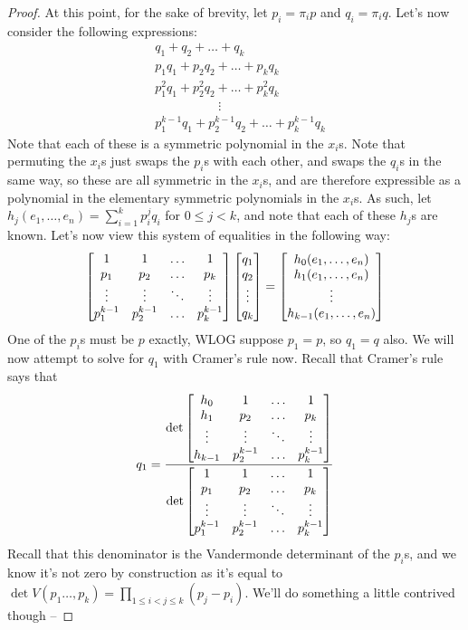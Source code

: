 \documentclass[12pt]{scrartcl}
\begin{document}
\begin{proof}
At this point, for the sake of brevity, let $p_i = \pi_i p$ and $q_i = \pi_i q$. Let's now consider the following expressions: 
\begin{align*}
    & q_1 + q_2 + \dots + q_k \\ 
    & p_1 q_1 + p_2 q_2 + \dots + p_k q_k \\ 
    & p_1^2 q_1 + p_2^2 q_2 + \dots + p_k^2 q_k \\ 
    & \qquad \qquad \quad \vdots \\
    & p_1^{k-1} q_1 + p_2^{k-1} q_2 + \dots + p_k^{k-1} q_k 
\end{align*}
Note that each of these is a symmetric polynomial in the $x_i$s. Note that permuting the $x_i$s just swaps the $p_i$s with each other, and swaps the $q_i$s in the same way, so these are all symmetric in the $x_i$s, and are therefore expressible as a polynomial in the elementary symmetric polynomials in the $x_i$s. As such, let $h_j(e_1, \dots, e_n) = \sum_{i=1}^k p_i^j q_i$ for $0 \leq j < k$, and note that each of these $h_j$s are known. 
Let's now view this system of equalities in the following way: 
\[
    \begin{bmatrix}1 & 1 & \dots & 1 \\
          p_1 & p_2 & \dots & p_k \\ 
          \vdots & \vdots & \ddots & \vdots \\ 
          p_1^{k-1} & p_2^{k-1} & \dots & p_k^{k-1}\end{bmatrix}
    \begin{bmatrix}q_1 \\ q_2 \\ \vdots \\ q_k \end{bmatrix} = \begin{bmatrix}h_0(e_1, \dots, e_n) \\ h_1 (e_1, \dots, e_n) \\ \vdots \\  h_{k-1}(e_1, \dots, e_n)\end{bmatrix} 
\]
One of the $p_i$s must be $p$ exactly, WLOG suppose $p_1 = p$, so $q_1 = q$ also. We will now attempt to solve for $q_1$ with Cramer's rule now. Recall that Cramer's rule says that
\[
    q_1 = \frac{\det \begin{bmatrix}h_0 & 1 & \dots & 1 \\
          h_1 & p_2 & \dots & p_k \\ 
          \vdots & \vdots & \ddots & \vdots \\ 
          h_{k-1} & p_2^{k-1} & \dots & p_k^{k-1}\end{bmatrix}}{\det \begin{bmatrix}1 & 1 & \dots & 1 \\
          p_1 & p_2 & \dots & p_k \\ 
          \vdots & \vdots & \ddots & \vdots \\ 
          p_1^{k-1} & p_2^{k-1} & \dots & p_k^{k-1}\end{bmatrix}}
\]
Recall that this denominator is the Vandermonde determinant of the $p_i$s, and we know it's not zero by construction as it's equal to $\det V(p_1 \dots, p_k) = \prod_{1 \leq i < j \leq k} (p_j - p_i)$. We'll do something a little contrived though -- 

\end{proof}
\end{document}
